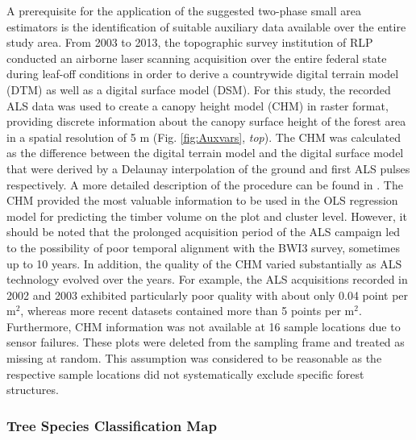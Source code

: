 A prerequisite for the application of the suggested two-phase small area estimators is the identification of suitable auxiliary data available over the entire study area. From 2003 to 2013, the topographic survey institution of RLP conducted an airborne laser scanning acquisition over the entire federal state during leaf-off conditions in order to derive a countrywide digital terrain model (DTM) as well as a digital surface model (DSM). For this study, the recorded ALS data was used to create a canopy height model (CHM) in raster format, providing discrete information about the canopy surface height of the forest area in a spatial resolution of 5 m (Fig. \ref{fig:Auxvars}, \textit{top}). The CHM was calculated as the difference between the digital terrain model and the digital surface model that were derived by a Delaunay interpolation of the ground and first ALS pulses respectively. A more detailed description of the procedure can be found in \citet{hill2017a}. The CHM provided the most valuable information to be used in the OLS regression model for predicting the timber volume on the plot and cluster level. However, it should be noted that the prolonged acquisition period of the ALS campaign led to the possibility of poor temporal alignment with the BWI3 survey, sometimes up to 10 years. In addition, the quality of the CHM varied substantially as ALS technology evolved over the years.  For example, the ALS acquisitions recorded in 2002 and 2003 exhibited particularly poor quality with about only 0.04 point per m$^2$, whereas more recent datasets contained more than 5 points per m$^2$. Furthermore, CHM information was not available at 16 sample locations due to sensor failures. These plots were deleted from the sampling frame and treated as missing at random. This assumption was considered to be reasonable as the respective sample locations did not systematically exclude specific forest structures.

\subsubsection{Tree Species Classification Map}
\label{sec:tspecclass}

